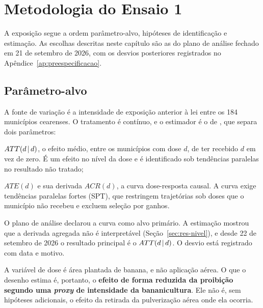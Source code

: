 
\chapter{Metodologia do Ensaio 1}
\label{cap:metodologia}

A exposição segue a ordem parâmetro-alvo, hipóteses de identificação e
estimação. As escolhas descritas neste capítulo são as do plano de análise
fechado em 21 de setembro de 2026, com os desvios posteriores registrados no
Apêndice~\ref{ap:preespecificacao}.

\section{Parâmetro-alvo}
\label{sec:estimando}

A fonte de variação é a intensidade de exposição anterior à lei entre os 184
municípios cearenses. O tratamento é contínuo, e o estimador é o de
\citet{callaway2024continuous}, que separa dois parâmetros:

\begin{alineas}
  \item $ATT(d\,|\,d)$, o efeito médio, entre os municípios com dose $d$, de ter
    recebido $d$ em vez de zero. É um efeito no nível da dose e é identificado
    sob tendências paralelas no resultado não tratado;
  \item $ATE(d)$ e sua derivada $ACR(d)$, a curva dose-resposta causal. A curva
    exige tendências paralelas fortes (SPT), que restringem trajetórias sob
    doses que o município não recebeu e excluem seleção por ganhos.
\end{alineas}

O plano de análise declarou a curva como alvo primário. A estimação mostrou que
a derivada agregada não é interpretável (Seção~\ref{sec:res-nivel}), e desde 22
de setembro de 2026 o resultado principal é o $ATT(d\,|\,d)$. O desvio está registrado
com data e motivo.

A variável de dose é área plantada de banana, e não aplicação aérea. O que o
desenho estima é, portanto, o \textbf{efeito de forma reduzida da proibição
segundo uma \emph{proxy} de intensidade da bananicultura}. Ele não é, sem
hipóteses adicionais, o efeito da retirada da pulverização aérea onde ela
ocorria. 

